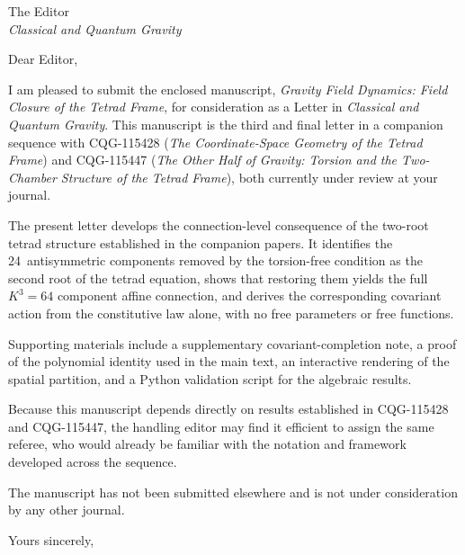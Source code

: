 \documentclass{letter}
\begin{document}
\begin{letter}{%
  The Editor\\%
  \textit{Classical and Quantum Gravity}%
}

\opening{Dear Editor,}

I am pleased to submit the enclosed manuscript,
\textit{Gravity Field Dynamics: Field Closure of the
Tetrad Frame}, for consideration as a Letter in
\textit{Classical and Quantum Gravity}.  This manuscript
is the third and final letter in a companion sequence
with CQG-115428 (\textit{The Coordinate-Space Geometry
of the Tetrad Frame}) and CQG-115447 (\textit{The Other
Half of Gravity: Torsion and the Two-Chamber Structure
of the Tetrad Frame}), both currently under review at
your journal.

The present letter develops the connection-level
consequence of the two-root tetrad structure established
in the companion papers.  It identifies the
24~antisymmetric components removed by the torsion-free
condition as the second root of the tetrad equation,
shows that restoring them yields the full $K^3 = 64$
component affine connection, and derives the
corresponding covariant action from the constitutive
law alone, with no free parameters or free functions.

Supporting materials include a supplementary
covariant-completion note, a proof of the polynomial
identity used in the main text, an interactive rendering
of the spatial partition, and a Python validation script
for the algebraic results.

Because this manuscript depends directly on results
established in CQG-115428 and CQG-115447, the handling
editor may find it efficient to assign the same referee,
who would already be familiar with the notation and
framework developed across the sequence.

The manuscript has not been submitted elsewhere and is
not under consideration by any other journal.

\closing{Yours sincerely,}

\end{letter}
\end{document}
